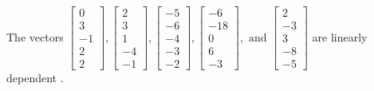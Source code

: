\begin{exercise}
\begin{exerciseStatement}
  \end{exerciseStatement}
  \begin{exerciseAnswer}
   The vectors \(\left[\begin{array}{r}
0 \\
3 \\
-1 \\
2 \\
2
\end{array}\right] , \left[\begin{array}{r}
2 \\
3 \\
1 \\
-4 \\
-1
\end{array}\right] , \left[\begin{array}{r}
-5 \\
-6 \\
-4 \\
-3 \\
-2
\end{array}\right] , \left[\begin{array}{r}
-6 \\
-18 \\
0 \\
6 \\
-3
\end{array}\right] , \text{ and } \left[\begin{array}{r}
2 \\
-3 \\
3 \\
-8 \\
-5
\end{array}\right]\) are 
  	 linearly dependent  .
  


  \end{exerciseAnswer}
\end{exercise}